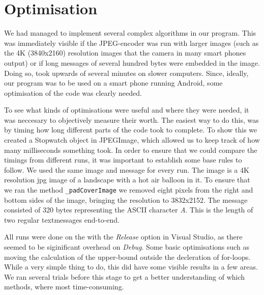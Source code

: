 \section{Optimisation}
We had managed to implement several complex algorithms in our program. 
This was immediately visible if the JPEG-encoder was run with larger images (such as the 4K (3840x2160) resolution images that the camera in many smart phones output) or if long messages of several hundred bytes were embedded in the image.
Doing so, took upwards of several minutes on slower computers.
Since, ideally, our program was to be used on a smart phone running Android, some optimisation of the code was clearly needed.

To see what kinds of optimisations were useful and where they were needed, it was neccesary to objectively measure their worth.
The easiest way to do this, was by timing how long different parts of the code took to complete.
To show this we created a Stopwatch object in JPEGImage, which allowed us to keep track of how many milliseconds something took.
In order to ensure that we could compare the timings from different runs, it was important to establish some base rules to follow.
We used the same image and message for every run. 
The image is a 4K resolution jpg image of a landscape with a hot air balloon in it. 
To ensure that we ran the method \lstinline|_padCoverImage| we removed eight pixels from the right and bottom sides of the image, bringing the resolution to 3832x2152.
The message consisted of 320 bytes representing the ASCII character \textit{A}. 
This is the length of two regular textmessages end-to-end.

All runs were done on the with the \textit{Release} option in Visual Studio, as there seemed to be siginificant overhead on \textit{Debug}.
Some basic optimisations such as moving the calculation of the upper-bound outside the decleration of for-loops.
While a very simple thing to do, this did have some visible results in a few areas.
We ran several trials before this stage to get a better understanding of which methods, where most time-consuming.

